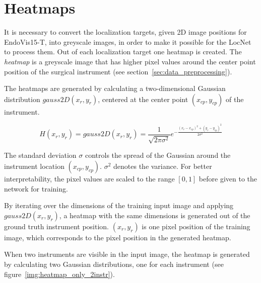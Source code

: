 \section{Heatmaps}
\label{sec:heatmaps}
It is necessary to convert the localization targets, given 2D image positions for EndoVis15-T, into greyscale images, in order to make it possible for the LocNet to process them.
Out of each localization target one heatmap is created.
The \emph{heatmap} is a greyscale image that has higher pixel values around the center point position of the surgical instrument (see section~\ref{sec:data_preprocessing}).

The heatmaps are generated by calculating a two-dimensional Gaussian distribution $gauss2D(x_r,y_r)$, centered at the center point $(x_{cp}, y_{cp})$ of the instrument.

\begin{equation}
\label{eq:gauss2D_function}
H(x_r,y_r)=gauss2D(x_r,y_r) = \frac{1}{\sqrt{2\pi\sigma^2} } e^{ -\frac{(x_r-x_{cp})^2 + (y_r-y_{cp})^2}{2\sigma^2} }
\end{equation}

The standard deviation $\sigma$ controls the spread of the Gaussian around the instrument location $(x_{cp}, y_{cp})$. $\sigma^2$ denotes the variance. For better interpretability, the pixel values are scaled to the range $[0, 1]$ before given to the network for training.

By iterating over the dimensions of the training input image and applying $gauss2D(x_r,y_r)$, a heatmap with the same dimensions is generated out of the ground truth instrument position.
$(x_r, y_r)$ is one pixel position of the training image, which corresponds to the pixel position in the generated heatmap.


When two instruments are visible in the input image, the heatmap is generated by calculating two Gaussian distributions, one for each instrument (see figure~\ref{img:heatmap_only_2instr}).

